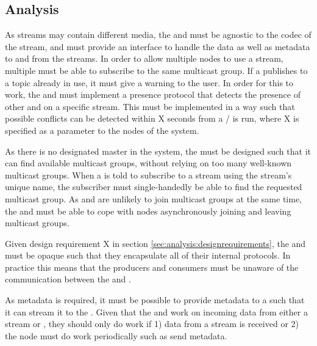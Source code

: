 \subsection{Analysis} \label{sec:analysis:pubsup:introduction}
As streams may contain different media, the  and  must be agnostic to the codec of the stream, and must provide an interface to handle the data as well as metadata to and from the streams.
In order to allow multiple nodes to use a stream, multiple  must be able to subscribe to the same multicast group. If a  publishes to a topic already in use, it must give a warning to the user. In order for this to work, the  and  must implement a presence protocol that detects the presence of other  and  on a specific stream. This must be implemented in a way such that possible conflicts can be detected within X seconds from a / is run, where X is specified as a parameter to the nodes of the system.

As there is no designated master in the system, the  must be designed such that it can find available multicast groups, without relying on too many well-known multicast groups. When a  is told to subscribe to a stream using the stream's unique name, the subscriber must single-handedly be able to find the requested multicast group.
As  and  are unlikely to join multicast groups at the same time, the  and  must be able to cope with nodes asynchronously joining and leaving multicast groups.

Given design requirement X in section \ref{sec:analysis:designrequirements}, the  and  must be opaque such that they encapsulate all of their internal protocols. In practice this means that the producers and consumers must be unaware of the communication between the  and .



As metadata is required, it must be possible to provide metadata to a  such that it can stream it to the .
Given that the  and  work on incoming data from either a stream or , they should only do work if 1) data from a stream is received or 2) the node must do work periodically such as send metadata.

